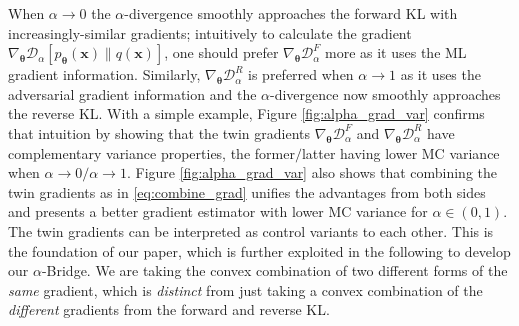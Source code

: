\documentclass[letterpaper]{article} %
\newcommand{\Dc}[0]{\ensuremath{\mathcal{D}} }
\newcommand{\xv}[0]{\ensuremath{\boldsymbol{x}} }
\newcommand{\thetav}[0]{\ensuremath{\boldsymbol{\theta}} }
\begin{document}
When $\alpha\rightarrow0$ the $\alpha$-divergence smoothly approaches the forward KL with increasingly-similar gradients; intuitively to calculate the gradient $\nabla_{\thetav} \Dc_{\alpha} [p_{\thetav}(\xv) \| q(\xv)]$, one should prefer $\nabla_{\thetav} \Dc_{\alpha}^F$ more as it uses the ML gradient information.
Similarly, $\nabla_{\thetav} \Dc_{\alpha}^R$ is preferred when $\alpha \rightarrow 1$ as it uses the adversarial gradient information and the $\alpha$-divergence now smoothly approaches the reverse KL.
With a simple example, Figure \ref{fig:alpha_grad_var} confirms that intuition by showing that the twin gradients $\nabla_{\thetav} \Dc_{\alpha}^F$ and $\nabla_{\thetav} \Dc_{\alpha}^R$ have complementary variance properties, the former$/$latter having lower MC variance when $\alpha \rightarrow 0 / \alpha \rightarrow 1$.
Figure \ref{fig:alpha_grad_var} also shows that combining the twin gradients as in \eqref{eq:combine_grad} unifies the advantages from both sides and presents a better gradient estimator with lower MC variance for $\alpha \in (0, 1)$.
The twin gradients can be interpreted as control variants to each other.
This is the foundation of our paper, which is further exploited in the following to develop our $\alpha$-Bridge. We are taking the convex combination of two different forms of the {\em same} gradient, which is {\em distinct} from just taking a convex combination of the {\em different} gradients from the forward and reverse KL.
\end{document}
